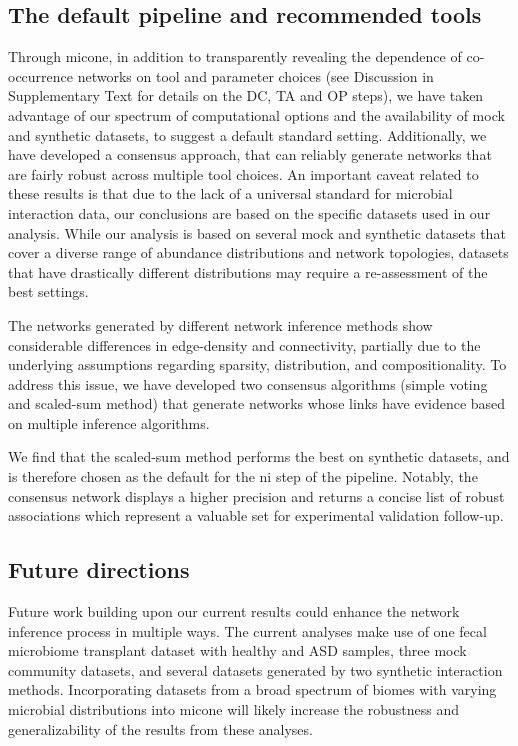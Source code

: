   \subsection*{The default pipeline and recommended tools}

  Through \ac{micone}, in addition to transparently revealing the dependence of co-occurrence networks on tool and parameter choices (see Discussion in Supplementary Text for details on the DC, TA and OP steps), we have taken advantage of our spectrum of computational options and the availability of mock and synthetic datasets, to suggest a default standard setting.
  Additionally, we have developed a consensus approach, that can reliably generate networks that are fairly robust across multiple tool choices.
  An important caveat related to these results is that due to the lack of a universal standard for microbial interaction data, our conclusions are based on the specific datasets used in our analysis.
  While our analysis is based on several mock and synthetic datasets that cover a diverse range of abundance distributions and network topologies, datasets that have drastically different distributions may require a re-assessment of the best settings.

  The networks generated by different network inference methods show considerable differences in edge-density and connectivity, partially due to the underlying assumptions regarding sparsity, distribution, and compositionality.
  To address this issue, we have developed two consensus algorithms (simple voting and scaled-sum method) that generate networks whose links have evidence based on multiple inference algorithms.

 We find that the scaled-sum method performs the best on synthetic datasets, and is therefore chosen as the default for the \ac{ni} step of the pipeline.
 Notably, the consensus network displays a higher precision and returns a concise list of robust associations which represent a valuable set for experimental validation follow-up.

  \subsection*{Future directions}

  Future work building upon our current results could enhance the network inference process in multiple ways.
  The current analyses make use of one fecal microbiome transplant dataset with healthy and ASD samples, three mock community datasets, and several datasets generated by two synthetic interaction methods.
  Incorporating datasets from a broad spectrum of biomes with varying microbial distributions into \ac{micone} will likely increase the robustness and generalizability of the results from these analyses.

